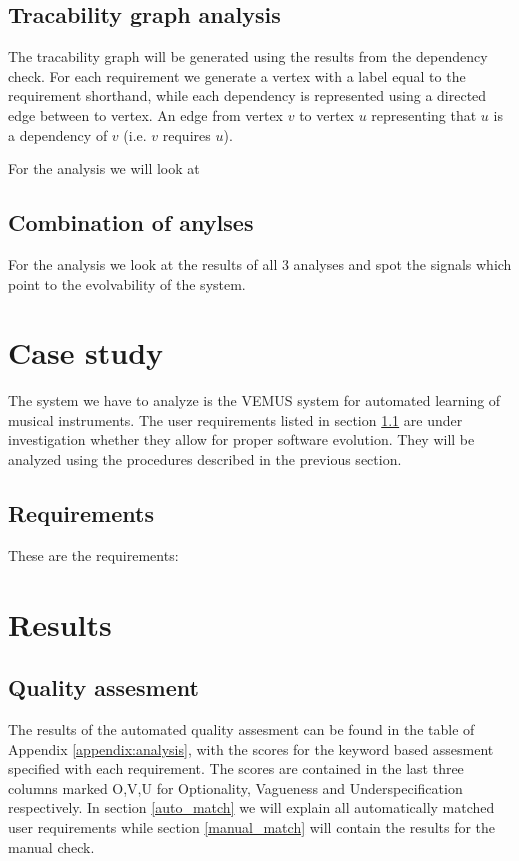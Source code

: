\documentclass[a4paper,twoside,11pt]{article}
\begin{document}
\subsection{Tracability graph analysis}
The tracability graph will be generated using the results from the dependency check. For each requirement we generate a vertex with a label equal to the requirement shorthand, while each dependency is represented using a directed edge between to vertex. An edge from vertex $v$ to vertex $u$ representing that $u$ is a dependency of $v$ (i.e. $v$ requires $u$). 

For the analysis we will look at 
  
\subsection{Combination of anylses}
For the analysis we look at the results of all 3 analyses and spot the signals which point to the evolvability of the system.

\section{Case study}
The system we have to analyze is the VEMUS system for automated learning of musical instruments. The user requirements listed in section \ref{userreq} are under investigation whether they allow for proper software evolution. They will be analyzed using the procedures described in the previous section.

\subsection{Requirements}
\label{userreq}
These are the requirements:


\section{Results}
\subsection{Quality assesment}
The results of the automated quality assesment can be found in the table of Appendix \ref{appendix:analysis}, with the scores for the keyword based assesment specified with each requirement. The scores are contained in the last three columns marked {\sc O,V,U} for Optionality, Vagueness and Underspecification respectively. In section \ref{auto_match} we will explain all automatically matched user requirements while section \ref{manual_match} will contain the results for the manual check. \\
\end{document}
